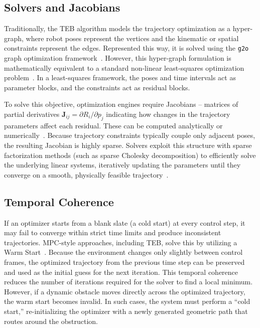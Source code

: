 \subsection{Solvers and Jacobians}
\label{subsec:solvers-jacobians}
Traditionally, the TEB algorithm models the trajectory optimization as a hyper-graph, where robot poses represent the vertices and the kinematic or spatial constraints represent the edges. Represented this way, it is solved using the \texttt{g2o} graph optimization framework~\cite{kummerle2011g2o}. However, this hyper-graph formulation is mathematically equivalent to a standard non-linear least-squares optimization problem~\cite{agarwal2012ceres}. In a least-squares framework, the poses and time intervals act as parameter blocks, and the constraints act as residual blocks.

To solve this objective, optimization engines require Jacobians -- matrices of partial derivatives $\mathbf{J}_{ij} = \partial R_i / \partial p_j$ indicating how changes in the trajectory parameters affect each residual. These can be computed analytically or numerically~\cite{nocedal2006numerical}. Because trajectory constraints typically couple only adjacent poses, the resulting Jacobian is highly sparse. Solvers exploit this structure with sparse factorization methods (such as sparse Cholesky decomposition) to efficiently solve the underlying linear systems, iteratively updating the parameters until they converge on a smooth, physically feasible trajectory~\cite{rosmann2013sparse,agarwal2012ceres}.

\subsection{Temporal Coherence}
\label{subsec:temporal-coherence}
If an optimizer starts from a blank slate (a cold start) at every control step, it may fail to converge within strict time limits and produce inconsistent trajectories. MPC-style approaches, including TEB, solve this by utilizing a Warm Start~\cite{rosmann2013sparse}. Because the environment changes only slightly between control frames, the optimized trajectory from the previous time step can be preserved and used as the initial guess for the next iteration. This temporal coherence reduces the number of iterations required for the solver to find a local minimum. However, if a dynamic obstacle moves directly across the optimized trajectory, the warm start becomes invalid. In such cases, the system must perform a ``cold start,'' re-initializing the optimizer with a newly generated geometric path that routes around the obstruction.

